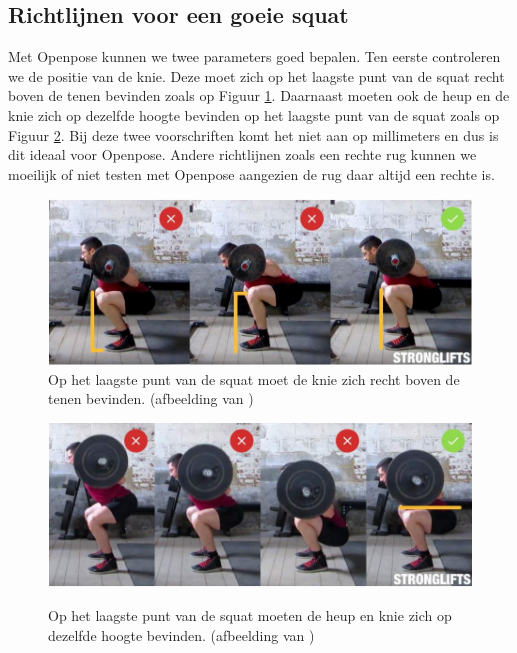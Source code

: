 \documentclass[a4paper,twoside,kulak]{kulakreport}
\begin{document}
\subsection{Richtlijnen voor een goeie squat}

Met Openpose kunnen we twee parameters goed bepalen.
Ten eerste controleren we de positie van de knie. Deze moet zich op het laagste punt van de squat recht boven de tenen bevinden zoals op Figuur \ref{squat_knie}. Daarnaast moeten ook de heup en de knie zich op dezelfde hoogte bevinden op het laagste punt van de squat zoals op Figuur \ref{squat_heup}. Bij deze twee voorschriften komt het niet aan op millimeters en dus is dit ideaal voor Openpose. Andere richtlijnen zoals een rechte rug kunnen we moeilijk of niet testen met Openpose aangezien de rug daar altijd een rechte is.

\begin{figure}[H]
	\includegraphics[width= \textwidth]{squat_knie}
	\caption{Op het laagste punt van de squat moet de knie zich recht boven de tenen bevinden. (afbeelding van \cite{squats})}
	\label{squat_knie}
\end{figure}

\begin{figure}[H]
	\includegraphics[width= \textwidth]{squat_heup}
	\label{squat_heup}
	\caption{Op het laagste punt van de squat moeten de heup en knie zich op dezelfde hoogte bevinden. (afbeelding van \cite{squats})}
\end{figure}
\end{document}
